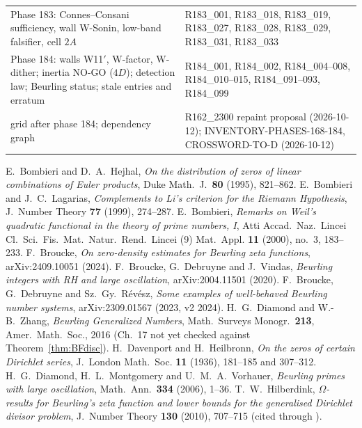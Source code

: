 \documentclass[11pt]{amsart}
\theoremstyle{definition}
\theoremstyle{remark}
\begin{document}
\begin{center}
\begin{tabularx}{\textwidth}{@{}p{5.2cm}Y@{}}
Phase 183: Connes--Consani sufficiency, wall W-Sonin, low-band falsifier, cell $2A$ & R183\_001, R183\_018, R183\_019, R183\_027, R183\_028, R183\_029, R183\_031, R183\_033 \\
Phase 184: walls W11$'$, W-factor, W-dither; inertia NO-GO ($4D$); detection law; Beurling status; stale entries and erratum & R184\_001, R184\_002, R184\_004--008, R184\_010--015, R184\_091--093, R184\_099 \\
grid after phase 184; dependency graph & R162\_2300 repaint proposal (2026-10-12); INVENTORY-PHASES-168-184, CROSSWORD-TO-D (2026-10-12) \\
\bottomrule
\end{tabularx}
\end{center}

\begin{thebibliography}{99}
 E.~Bombieri and D.~A.~Hejhal, \emph{On the distribution of zeros of linear combinations of Euler products}, Duke Math.~J.\ \textbf{80} (1995), 821--862.
 E.~Bombieri and J.~C.~Lagarias, \emph{Complements to Li's criterion
for the Riemann Hypothesis}, J.~Number Theory \textbf{77} (1999), 274--287.
 E.~Bombieri, \emph{Remarks on Weil's quadratic functional in the theory of
prime numbers, I}, Atti Accad.~Naz.~Lincei Cl.~Sci.~Fis.~Mat.~Natur.~Rend.~Lincei (9) Mat.~Appl.
\textbf{11} (2000), no.~3, 183--233.
 F.~Broucke, \emph{On zero-density estimates for Beurling zeta functions}, arXiv:2409.10051 (2024).
 F.~Broucke, G.~Debruyne and J.~Vindas, \emph{Beurling integers with RH and large oscillation}, arXiv:2004.11501 (2020).
 F.~Broucke, G.~Debruyne and Sz.~Gy.~R\'ev\'esz, \emph{Some examples of well-behaved Beurling number systems}, arXiv:2309.01567 (2023, v2 2024).
 H.~G.~Diamond and W.-B.~Zhang, \emph{Beurling Generalized Numbers}, Math.\ Surveys Monogr.\ \textbf{213}, Amer.\ Math.\ Soc., 2016 (Ch.~17 not yet checked against Theorem~\ref{thm:BFdisc}).
 H.~Davenport and H.~Heilbronn, \emph{On the zeros of certain
Dirichlet series}, J.~London Math.~Soc. \textbf{11} (1936), 181--185 and 307--312.
 H.~G.~Diamond, H.~L.~Montgomery and U.~M.~A.~Vorhauer, \emph{Beurling primes with
large oscillation}, Math.~Ann.\ \textbf{334} (2006), 1--36.
 T.~W.~Hilberdink, \emph{$\Omega$-results for Beurling's zeta function and lower bounds for the generalised Dirichlet divisor problem}, J.~Number Theory \textbf{130} (2010), 707--715 (cited through \cite{Revesz2023}).

\end{thebibliography}
\end{document}
